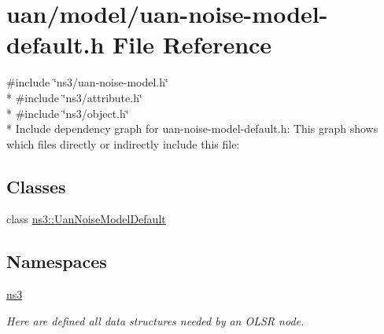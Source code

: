\hypertarget{uan-noise-model-default_8h}{}\section{uan/model/uan-\/noise-\/model-\/default.h File Reference}
\label{uan-noise-model-default_8h}
{\ttfamily \#include \char`\"{}ns3/uan-\/noise-\/model.\+h\char`\"{}}\\*
{\ttfamily \#include \char`\"{}ns3/attribute.\+h\char`\"{}}\\*
{\ttfamily \#include \char`\"{}ns3/object.\+h\char`\"{}}\\*
Include dependency graph for uan-\/noise-\/model-\/default.h\+:
This graph shows which files directly or indirectly include this file\+:
\subsection*{Classes}
\begin{DoxyCompactItemize}
\item 
class \hyperlink{classns3_1_1UanNoiseModelDefault}{ns3\+::\+Uan\+Noise\+Model\+Default}
\end{DoxyCompactItemize}
\subsection*{Namespaces}
\begin{DoxyCompactItemize}
\item 
 \hyperlink{namespacens3}{ns3}
\begin{DoxyCompactList}\small\item\em Here are defined all data structures needed by an O\+L\+SR node. \end{DoxyCompactList}\end{DoxyCompactItemize}
